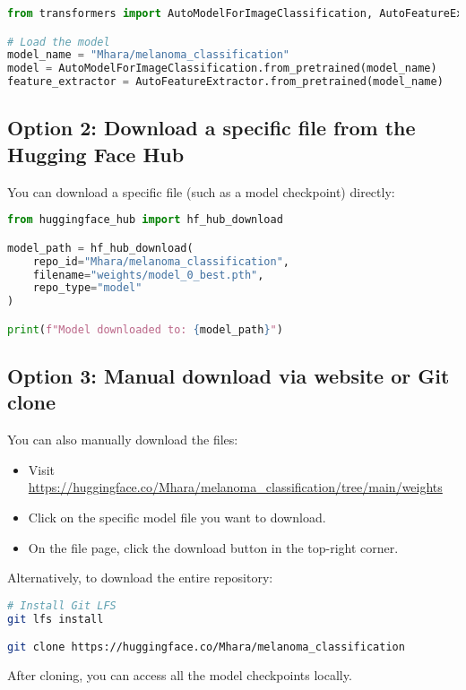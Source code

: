 \begin{lstlisting}[language=Python, caption={Load model and feature extractor from Hugging Face}, label={lst:huggingface_load}]
from transformers import AutoModelForImageClassification, AutoFeatureExtractor

# Load the model
model_name = "Mhara/melanoma_classification"
model = AutoModelForImageClassification.from_pretrained(model_name)
feature_extractor = AutoFeatureExtractor.from_pretrained(model_name)

\end{lstlisting}

\subsection{Option 2: Download a specific file from the Hugging Face Hub}

You can download a specific file (such as a model checkpoint) directly:

\begin{lstlisting}[language=Python, caption={Download specific model weight file}, label={lst:hf_hub_download}]
from huggingface_hub import hf_hub_download

model_path = hf_hub_download(
    repo_id="Mhara/melanoma_classification",
    filename="weights/model_0_best.pth", 
    repo_type="model"
)

print(f"Model downloaded to: {model_path}")
\end{lstlisting}

\subsection{Option 3: Manual download via website or Git clone}

You can also manually download the files:

\begin{itemize}
    \item Visit \url{https://huggingface.co/Mhara/melanoma_classification/tree/main/weights}
    \item Click on the specific model file you want to download.
    \item On the file page, click the download button in the top-right corner.
\end{itemize}

Alternatively, to download the entire repository:

\begin{lstlisting}[language=bash, caption={Clone the model repository with Git LFS}, label={lst:git_clone}]
# Install Git LFS
git lfs install

git clone https://huggingface.co/Mhara/melanoma_classification
\end{lstlisting}

\noindent
After cloning, you can access all the model checkpoints locally.


